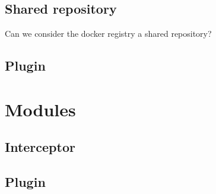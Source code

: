 \subsection{Shared repository}
Can we consider the docker registry a shared repository?

\subsection{Plugin}


\section{Modules}
\subsection{Interceptor}
\subsection{Plugin}

